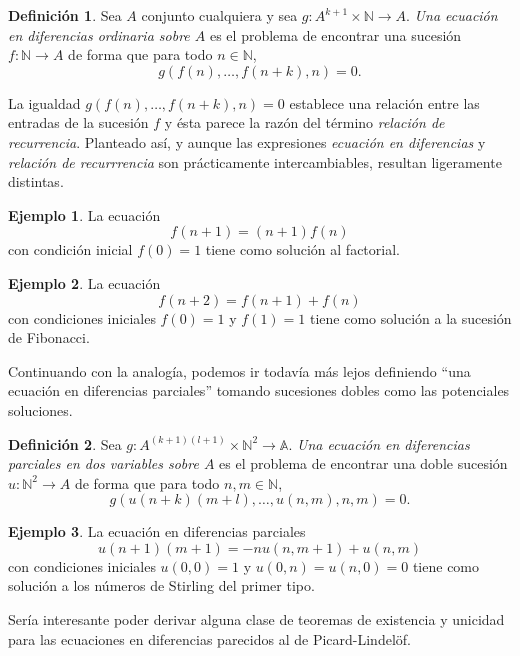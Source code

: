 \documentclass[letter,10pt,notitlepage]{amsart}
\theoremstyle{definition}
\newtheorem{definition}{Definición}
\newtheorem*{example}{Ejemplo}
\theoremstyle{remark}
\begin{document}
\begin{definition}
  Sea \( A\) conjunto cualquiera y sea \( g \colon A^{k+1} \times \mathbb{N} \to A\).
  \emph{Una ecuación en diferencias ordinaria sobre \( A\)} es el 
  problema de encontrar una sucesión \( f \colon \mathbb{N} \to A\) 
  de forma que para todo \( n \in \mathbb{N}\),
  \[ g(f(n), \dots, f(n+k),n) = 0.\]
\end{definition}

La igualdad \( g(f(n), \dots, f(n+k),n) = 0\)
establece una relación entre las entradas de la sucesión \( f\) y ésta
parece la razón del término \emph{relación de recurrencia}. Planteado
así, y aunque las expresiones \emph{ecuación en diferencias} y 
\emph{relación de recurrrencia} son prácticamente intercambiables, resultan
ligeramente distintas.

\begin{example}
  La ecuación \[ f(n+1) = (n+1)f(n)\] con condición inicial \( f(0)=1\)
  tiene como solución al factorial.
\end{example}

\begin{example}
  La ecuación \[ f(n+2) = f(n+1) + f(n)\] con condiciones iniciales
  \( f(0) = 1\) y \( f(1) = 1\) tiene como solución a la sucesión de Fibonacci.
\end{example}

Continuando con la analogía, podemos ir todavía más lejos definiendo 
``una ecuación en diferencias parciales'' tomando sucesiones dobles como
las potenciales soluciones.

\begin{definition}
  Sea \( g \colon A^{(k+1)(l+1)} \times \mathbb{N}^2 \to \mathbb{A}\).
  \emph{Una ecuación en diferencias parciales en dos variables sobre \( A\)} es el 
  problema de encontrar una doble sucesión \( u \colon \mathbb{N}^2 \to A\) 
  de forma que para todo \( n,m \in \mathbb{N}\),
  \[ g\left(u(n+k)(m+l),\dots,u(n,m),n,m\right) = 0.\]
\end{definition}


\begin{example}
  La ecuación en diferencias parciales \[ u(n+1)(m+1) = -nu(n,m+1) + u(n,m)\]
  con condiciones iniciales \( u(0,0) = 1\) y \( u(0,n) = u(n,0) = 0\)
  tiene como solución a los números de Stirling del primer tipo.
\end{example}

Sería interesante poder derivar alguna clase de teoremas de existencia
y unicidad para las ecuaciones en diferencias parecidos al de
Picard-Lindelöf.
\end{document}
